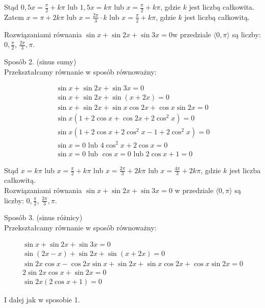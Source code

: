 \documentclass[10pt]{article}
\begin{document}
Stąd $0,5 x=\frac{\pi}{2}+k \pi$ lub $1,5 x=k \pi$ lub $x=\frac{\pi}{2}+k \pi$, gdzie $k$ jest liczbą całkowita.\\
Zatem $x=\pi+2 k \pi$ lub $x=\frac{2 \pi}{3} \cdot k$ lub $x=\frac{\pi}{2}+k \pi$, gdzie $k$ jest liczbą całkowitą.

Rozwiązaniami równania $\sin x+\sin 2 x+\sin 3 x=0 \mathrm{w}$ przedziale $\langle 0, \pi\rangle$ są liczby: $0, \frac{\pi}{2}$, $\frac{2 \pi}{3}, \pi$.

Sposób 2. (sinus sumy)\\
Przekształcamy równanie w sposób równoważny:

$$
\begin{gathered}
\sin x+\sin 2 x+\sin 3 x=0 \\
\sin x+\sin 2 x+\sin (x+2 x)=0 \\
\sin x+\sin 2 x+\sin x \cos 2 x+\cos x \sin 2 x=0 \\
\sin x\left(1+2 \cos x+\cos 2 x+2 \cos ^{2} x\right)=0 \\
\sin x\left(1+2 \cos x+2 \cos ^{2} x-1+2 \cos ^{2} x\right)=0 \\
\sin x=0 \text { lub } 4 \cos ^{2} x+2 \cos x=0 \\
\sin x=0 \text { lub } \cos x=0 \text { lub } 2 \cos x+1=0
\end{gathered}
$$

Stąd $x=k \pi$ lub $x=\frac{\pi}{2}+k \pi$ lub $x=\frac{2 \pi}{3}+2 k \pi$ lub $x=\frac{4 \pi}{3}+2 k \pi$, gdzie $k$ jest liczba całkowitą.\\
Rozwiązaniami równania $\sin x+\sin 2 x+\sin 3 x=0$ w przedziale $\langle 0, \pi\rangle$ są liczby: $0, \frac{\pi}{2}$, $\frac{2 \pi}{3}, \pi$.

Sposób 3. (sinus różnicy)\\
Przekształcamy równanie w sposób równoważny:

$$
\begin{gathered}
\sin x+\sin 2 x+\sin 3 x=0 \\
\sin (2 x-x)+\sin 2 x+\sin (x+2 x)=0 \\
\sin 2 x \cos x-\cos 2 x \sin x+\sin 2 x+\sin x \cos 2 x+\cos x \sin 2 x=0 \\
2 \sin 2 x \cos x+\sin 2 x=0 \\
\sin 2 x(2 \cos x+1)=0
\end{gathered}
$$

I dalej jak w sposobie 1.
\end{document}
